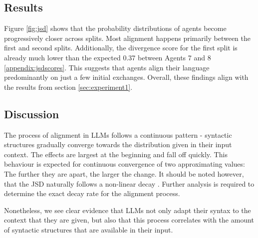 \documentclass[11pt]{article}
\begin{document}
\subsection{Results}
Figure \ref{fig:jsd} shows that the probability distributions of agents become progressively closer across splits.
Most alignment happens primarily between the first and second splits.
Additionally, the divergence score for the first split is already much lower than the expected 0.37 between Agents 7 and 8 \ref{appendix:jsdscores}. This suggests that agents align their language predominantly on just a few initial exchanges. Overall, these findings align with the results from section \ref{sec:experiment1}.


\subsection{Discussion}
The process of alignment in LLMs follows a continuous pattern - syntactic structures gradually converge towards the distribution given in their input context.
The effects are largest at the beginning and fall off quickly. This behaviour is expected for continuous convergence of two approximating values: The further they are apart, the larger the change. It should be noted however, that the JSD naturally follows a non-linear decay \cite{lin1991divergence}. Further analysis is required to determine the exact decay rate for the alignment process.

Nonetheless, we see clear evidence that LLMs not only adapt their syntax to the context that they are given, but also that this process correlates with the amount of syntactic structures that are available in their input.
\end{document}
